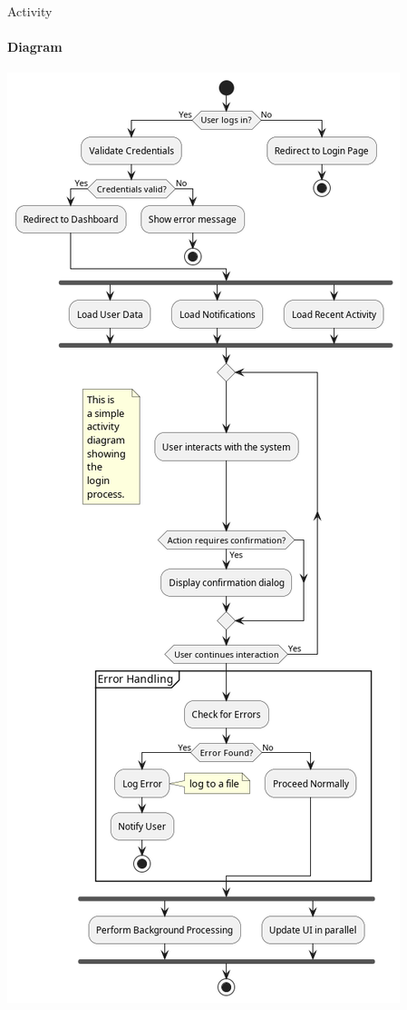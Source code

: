 \documentclass[aspectratio=169, table]{beamer}
\begin{document}
\begin{frame}{Activity}
	\framesubtitle{Diagram}
	\centering
	\includegraphics[width=\textwidth,height=0.97\textheight,keepaspectratio]{../../figures/out/activity_diagram.png}
\end{frame}
\end{document}

